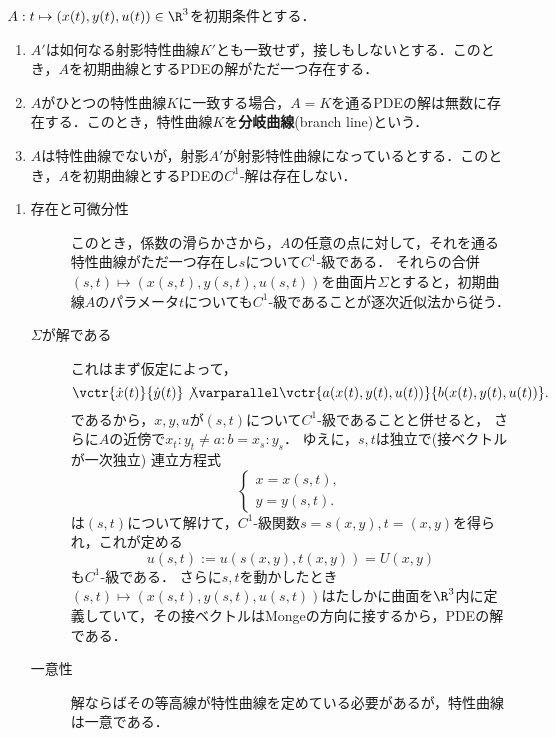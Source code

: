 \documentclass[uplatex,dvipdfmx]{jsreport}
\begin{document}
\begin{theorem}
    $A:t\mapsto(x(t),y(t),u(t))\in\R^3$を初期条件とする．
    \begin{enumerate}
        \item $A'$は如何なる射影特性曲線$K'$とも一致せず，接しもしないとする．このとき，$A$を初期曲線とするPDEの解がただ一つ存在する．
        \item $A$がひとつの特性曲線$K$に一致する場合，$A=K$を通るPDEの解は無数に存在する．このとき，特性曲線$K$を\textbf{分岐曲線}(branch line)という．
        \item $A$は特性曲線でないが，射影$A'$が射影特性曲線になっているとする．このとき，$A$を初期曲線とするPDEの$C^1$-解は存在しない．
    \end{enumerate}
\end{theorem}
\begin{Proof}\mbox{}
    \begin{enumerate}
        \item 
        \begin{description}
            \item[存在と可微分性] このとき，係数の滑らかさから，$A$の任意の点に対して，それを通る特性曲線がただ一つ存在し$s$について$C^1$-級である．
            それらの合併$(s,t)\mapsto (x(s,t),y(s,t),u(s,t))$を曲面片$\Sigma$とすると，初期曲線$A$のパラメータ$t$についても$C^1$-級であることが逐次近似法から従う\cite{吉田耕作-微分方程式}．
            \item[$\Sigma$が解である]
            これはまず仮定によって，
            \[\vctr{\dot{x}(t)}{\dot{y}(t)}\not\varparallel\vctr{a(x(t),y(t),u(t))}{b(x(t),y(t),u(t))}.\]
            であるから，$x,y,u$が$(s,t)$について$C^1$-級であることと併せると，
            さらに$A$の近傍で$x_t:y_t\neq a:b=x_s:y_s$．
            ゆえに，$s,t$は独立で(接ベクトルが一次独立)
            連立方程式
            \[\begin{cases}
                x=x(s,t),\\
                y=y(s,t).
            \end{cases}\]
            は$(s,t)$について解けて，$C^1$-級関数$s=s(x,y),t=(x,y)$を得られ，これが定める
            \[u(s,t):=u(s(x,y),t(x,y))=U(x,y)\]
            も$C^1$-級である．
            さらに$s,t$を動かしたとき$(s,t)\mapsto (x(s,t),y(s,t),u(s,t))$はたしかに曲面を$\R^3$内に定義していて，その接ベクトルはMongeの方向に接するから，PDEの解である．
            \item[一意性] 解ならばその等高線が特性曲線を定めている必要があるが，特性曲線は一意である．

\end{description}
\end{enumerate}
\end{Proof}
\end{document}
